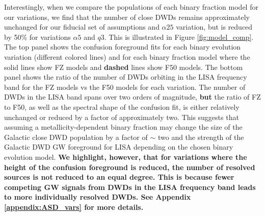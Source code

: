 \documentclass[twocolumn, linenumbers]{aastex631}
\begin{document}
Interestingly, when we compare the populations of each binary fraction model for our variations, we find that the number of close DWDs remains approximately unchanged for our fiducial set of assumptions and $\alpha25$ variation, but is reduced by 50\% for variations $\alpha5$ and $q3$. This is illustrated in Figure \ref{fig:model_comp}. The top panel shows the confusion foreground fits for each binary evolution variation (different colored lines) and for each binary fraction model where the solid lines show FZ models and \textbf{dashed} lines show F50 models. The bottom panel shows the ratio of the number of DWDs orbiting in the LISA frequency band for the FZ models vs the F50 models for each variation. The number of DWDs in the LISA band spans over two orders of magnitude, \textbf{but} the ratio of FZ to F50, as well as the spectral shape of the confusion fit, is either relatively unchanged or reduced by a factor of approximately two. This suggests that assuming a metallicity-dependent binary fraction may change the size of the Galactic close DWD population by a factor of $\sim$ two and the strength of the Galactic DWD GW foreground for LISA depending on the chosen binary evolution model. \textbf{We highlight, however, that for variations where the height of the confusion foreground is reduced, the number of resolved sources is not reduced to an equal degree. This is because fewer competing GW signals from DWDs in the LISA frequency band leads to more individually resolved DWDs. See Appendix \ref{appendix:ASD_vars} for more details.} 
\end{document}
